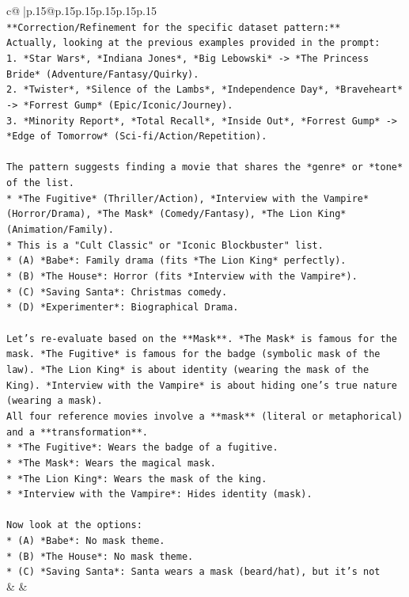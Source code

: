 \documentclass{article}
\begin{document}
{\begin{supertabular}{c@{$\;$}|p{.15\linewidth}@{}p{.15\linewidth}p{.15\linewidth}p{.15\linewidth}p{.15\linewidth}p{.15\linewidth}}
{{{\\ 
\texttt{**Correction/Refinement for the specific dataset pattern:**} \\
\texttt{Actually, looking at the previous examples provided in the prompt:} \\
\texttt{1.  *Star Wars*, *Indiana Jones*, *Big Lebowski* {-}> *The Princess Bride* (Adventure/Fantasy/Quirky).} \\
\texttt{2.  *Twister*, *Silence of the Lambs*, *Independence Day*, *Braveheart* {-}> *Forrest Gump* (Epic/Iconic/Journey).} \\
\texttt{3.  *Minority Report*, *Total Recall*, *Inside Out*, *Forrest Gump* {-}> *Edge of Tomorrow* (Sci{-}fi/Action/Repetition).} \\
\\ 
\texttt{The pattern suggests finding a movie that shares the *genre* or *tone* of the list.} \\
\texttt{*   *The Fugitive* (Thriller/Action), *Interview with the Vampire* (Horror/Drama), *The Mask* (Comedy/Fantasy), *The Lion King* (Animation/Family).} \\
\texttt{*   This is a "Cult Classic" or "Iconic Blockbuster" list.} \\
\texttt{*   (A) *Babe*: Family drama (fits *The Lion King* perfectly).} \\
\texttt{*   (B) *The House*: Horror (fits *Interview with the Vampire*).} \\
\texttt{*   (C) *Saving Santa*: Christmas comedy.} \\
\texttt{*   (D) *Experimenter*: Biographical Drama.} \\
\\ 
\texttt{Let's re{-}evaluate based on the **Mask**. *The Mask* is famous for the mask. *The Fugitive* is famous for the badge (symbolic mask of the law). *The Lion King* is about identity (wearing the mask of the King). *Interview with the Vampire* is about hiding one's true nature (wearing a mask).} \\
\texttt{All four reference movies involve a **mask** (literal or metaphorical) and a **transformation**.} \\
\texttt{*   *The Fugitive*: Wears the badge of a fugitive.} \\
\texttt{*   *The Mask*: Wears the magical mask.} \\
\texttt{*   *The Lion King*: Wears the mask of the king.} \\
\texttt{*   *Interview with the Vampire*: Hides identity (mask).} \\
\\ 
\texttt{Now look at the options:} \\
\texttt{*   (A) *Babe*: No mask theme.} \\
\texttt{*   (B) *The House*: No mask theme.} \\
\texttt{*   (C) *Saving Santa*: Santa wears a mask (beard/hat), but it's not} \\
            }
        }
    }
    & & \\ \\


\end{supertabular}}
\end{document}
